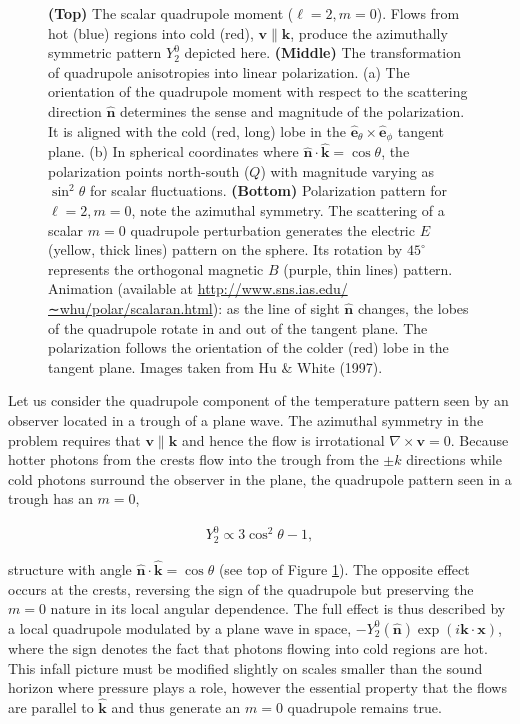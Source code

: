 \documentclass[a4paper,11pt]{article}
\begin{document}
\begin{figure}[t!]
    \caption{\footnotesize{\textbf{(Top)} The scalar quadrupole moment ($\ell=2,m=0$). Flows from hot (blue) regions into cold (red), $\bm{v}\parallel\bm{k}$, produce the azimuthally symmetric pattern $Y_2^0$ depicted here. \textbf{(Middle)} The transformation of quadrupole anisotropies into linear polarization. (a) The orientation of the quadrupole moment with respect to the scattering direction $\bm{\hat{n}}$ determines the sense and magnitude of the polarization. It is aligned with the cold (red, long) lobe in the $\bm{\hat{e}}_\theta\times\bm{\hat{e}}_\phi$ tangent plane. (b) In spherical coordinates where $\bm{\hat{n}}\cdot\bm{\hat{k}}=\cos\theta$, the polarization points north-south ($Q$) with magnitude varying as $\sin^2θ$ for scalar fluctuations. \textbf{(Bottom)} Polarization pattern for $\ell=2,m=0$, note the azimuthal symmetry. The scattering of a scalar $m=0$ quadrupole perturbation generates the electric $E$ (yellow, thick lines) pattern on the sphere. Its rotation by $45^\circ$ represents the orthogonal magnetic $B$ (purple, thin lines) pattern. Animation (available at \href{http://www.sns.ias.edu/∼whu/polar/scalaran.html}{http://www.sns.ias.edu/∼whu/polar/scalaran.html}): as the line of sight $\bm{\hat{n}}$ changes, the lobes of the quadrupole rotate in and out of the tangent plane. The polarization follows the orientation of the colder (red) lobe in the tangent plane. Images taken from Hu \& White (1997).}}
    \label{fig:scalar}
\end{figure}

{\noindent}Let us consider the quadrupole component of the temperature pattern seen by an observer located in a trough of a plane wave. The azimuthal symmetry in the problem requires that $\bm{v}\parallel\bm{k}$ and hence the flow is irrotational $\nabla\times\bm{v}=0$. Because hotter photons from the crests flow into the trough from the $\pm k$ directions while cold photons surround the observer in the plane, the quadrupole pattern seen in a trough has an $m = 0$,

\begin{align*}
    Y_2^0 \propto 3\cos^2\theta-1,
\end{align*}

{\noindent}structure with angle $\bm{\hat{n}\cdot\hat{k}}=\cos\theta$ (see top of Figure \ref{fig:scalar}). The opposite effect occurs at the crests, reversing the sign of the quadrupole but preserving the $m=0$ nature in its local angular dependence. The full effect is thus described by a local quadrupole modulated by a plane wave in space, $-Y_2^0(\bm{\hat{n}})\exp(i\bm{k}\cdot\bm{x})$, where the sign denotes the fact that photons flowing into cold regions are hot. This infall picture must be modified slightly on scales smaller than the sound horizon where pressure plays a role, however the essential property that the flows are parallel to $\bm{\hat{k}}$ and thus generate an $m=0$ quadrupole remains true.
\end{document}

